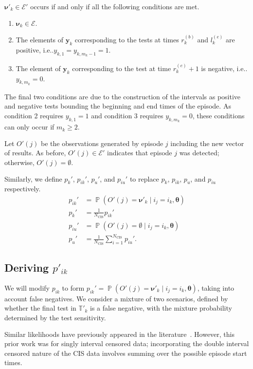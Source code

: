 \documentclass[12pt]{article}
\makeatletter
\DeclareMathOperator{\prob}{\mathbb{P}}
\newcommand\set{\mathcal}
\renewcommand{\vec}[1]{\bm{#1}}
\newcommand{\Ncis}{N_\text{CIS}}
\newcommand{\sched}{\mathbb{T}}
\DeclareRobustCommand\onedot{\futurelet\@let@token\@onedot}
\def\@onedot{\ifx\@let@token.\else.\null\fi\xspace}
\def\ie{i.e\onedot} \def\Ie{{I.e}\onedot}
\makeatother
\begin{document}
$\vec{\nu}'_k \in \set{E}'$ occurs if and only if all the following conditions are met.
\begin{enumerate}
  \item $\vec{\nu}_k \in \set{E}$.
  \item The elements of $\vec{y}_k$ corresponding to the tests at times $r_k^{(b)}$ and $l_k^{(e)}$ are positive, \ie $y_{k,1} = y_{k,m_k-1} = 1$.
  \item The element of $\vec{y}_k$ corresponding to the test at time $r_k^{(e)} + 1$ is negative, \ie $y_{k,m_k} = 0$.
\end{enumerate}
The final two conditions are due to the construction of the intervals as positive and negative tests bounding the beginning and end times of the episode.
As condition 2 requires $y_{k,1} = 1$ and condition 3 requires $y_{k,m_k} = 0$, these conditions can only occur if $m_k \geq 2$.

Let $O'(j)$ be the observations generated by episode $j$ including the new vector of results.
As before, $O'(j) \in \set{E}'$ indicates that episode $j$ was detected; otherwise, $O'(j) = \emptyset$.

Similarly, we define $p_k'$, $p_{ik}'$, $p_u'$, and $p_{iu}'$ to replace $p_k$, $p_{ik}$, $p_u$, and $p_{iu}$ respectively.
\begin{align}
    p_{ik}' &= \prob(O'(j) = \vec{\nu}'_k \mid i_j = i_k, \vec{\theta}) \\
    p_k' &= \frac{1}{\Ncis} p_{ik}' \\
    p_{iu}' &= \prob(O'(j) = \emptyset \mid i_j = i_k, \vec{\theta}) \\
    p_u' &= \frac{1}{\Ncis} \sum_{i=1}^{\Ncis} p_{iu}'.
\end{align}

\subsection{Deriving $p'_{ik}$} \label{imperf-test:sec:modifying-p_ia}

We will modify $p_{ik}$ to form $p_{ik}' = \prob(O'(j) = \vec{\nu}'_k \mid i_j = i_k, \vec{\theta})$, taking into account false negatives.
We consider a mixture of two scenarios, defined by whether the final test in $\sched'_{k}$ is a false negative, with the mixture probability determined by the test sensitivity.

Similar likelihoods have previously appeared in the literature~\citep[e.g.][eq.\ (2)]{piresIntervalMisclassify}.
However, this prior work was for singly interval censored data; incorporating the double interval censored nature of the CIS data involves summing over the possible episode start times.
\end{document}
